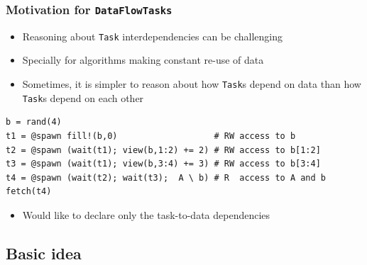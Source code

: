 \documentclass{beamer}
\begin{document}
\begin{frame}[fragile]
\frametitle{Motivation for \texttt{DataFlowTasks}}

\begin{itemize}
    \item Reasoning about \texttt{Task} interdependencies can be
    challenging
    \item Specially for algorithms making constant re-use of data   
    \item Sometimes, it is simpler to reason about how \texttt{Task}s depend on data than how \texttt{Task}s depend on each other
\end{itemize}

\begin{example}
\begin{verbatim}    
b = rand(4)
t1 = @spawn fill!(b,0)                   # RW access to b
t2 = @spawn (wait(t1); view(b,1:2) += 2) # RW access to b[1:2]
t3 = @spawn (wait(t1); view(b,3:4) += 3) # RW access to b[3:4]
t4 = @spawn (wait(t2); wait(t3);  A \ b) # R  access to A and b
fetch(t4)
\end{verbatim}
\end{example}

\begin{itemize}
  \item<2-> \alert{Would like to declare only the task-to-data dependencies}
\end{itemize}

\end{frame}

\subsection{Basic idea}
\end{document}
